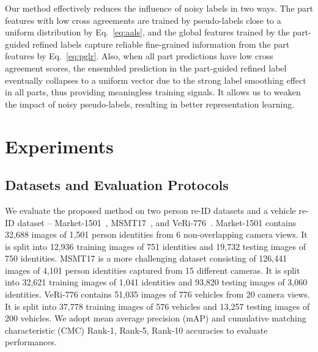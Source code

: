 \documentclass[10pt,twocolumn,letterpaper]{article}
\begin{document}
    
    Our method effectively reduces the influence of noisy labels in two ways. 
    The part features with low cross agreements are trained by pseudo-labels close to a uniform distribution by Eq.~\eqref{eq:aals}, 
    and the global features trained by the part-guided refined labels capture reliable fine-grained information from the part features by Eq.~\eqref{eq:pglr}.
    Also, when all part predictions have low cross agreement scores, the ensembled prediction in the part-guided refined label eventually collapses to a uniform vector due to the strong label smoothing effect in all parts, thus providing meaningless training signals.
    It allows us to weaken the impact of noisy pseudo-labels, resulting in better representation learning.
 \section{Experiments} \label{sec:4}
\subsection{Datasets and Evaluation Protocols}
    We evaluate the proposed method on two person re-ID datasets and a vehicle re-ID dataset -- Market-1501~\cite{zheng2015scalable}, MSMT17~\cite{wei2018person}, and VeRi-776~\cite{liu2016deep}.
    Market-1501 contains 32,688 images of 1,501 person identities from 6 non-overlapping camera views.
    It is split into 12,936 training images of 751 identities and 19,732 testing images of 750 identities.
    MSMT17 is a more challenging dataset consisting of 126,441 images of 4,101 person identities captured from 15 different cameras. 
    It is split into 32,621 training images of 1,041 identities and 93,820 testing images of 3,060 identities.
    VeRi-776 contains 51,035 images of 776 vehicles from 20 camera views.
    It is split into 37,778 training images of 576 vehicles and 13,257 testing images of 200 vehicles.
    We adopt mean average precision (mAP) and cumulative matching characteristic (CMC) Rank-1, Rank-5, Rank-10 accuracies to evaluate performances.
\end{document}
